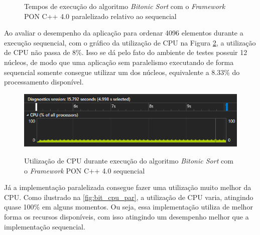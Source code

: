 \begin{figure}[!htb]
  \centering
  \caption{Tempos de execução do algoritmo \textit{Bitonic Sort} com o \textit{Framework} PON C++ 4.0 paralelizado relativo ao sequencial}
  \label{fig:bitonic_bench_rel}
  \end{figure}

Ao avaliar o desempenho da aplicação para ordenar 4096 elementos durante a
execução sequencial, com o gráfico da utilização de CPU na Figura
\ref{fig:bit_cpu}, a utilização de CPU não passa de 8\%. Isso se dá pelo fato do
ambiente de testes possuir 12 núcleos, de modo que uma aplicação sem paralelismo
executando de forma sequencial somente consegue utilizar um dos núcleos,
equivalente a 8.33\% do processamento disponível.

\begin{figure}[!htb]
\centering
\caption{Utilização de CPU durante execução do algoritmo \textit{Bitonic Sort}
com o \textit{Framework} PON C++ 4.0 sequencial}
\includegraphics[width=\textwidth]{../figures/cpu_bitonic.png}
\smallskip
{}
\label{fig:bit_cpu}
\end{figure}

Já a implementação paralelizada consegue fazer uma utilização muito melhor da
CPU. Como ilustrado na \ref{fig:bit_cpu_par}, a utilização de CPU varia,
atingindo quase 100\% em alguns momentos. Ou seja, essa implementação utiliza de
melhor forma os recursos disponíveis, com isso atingindo um desempenho melhor
que a implementação sequencial.

